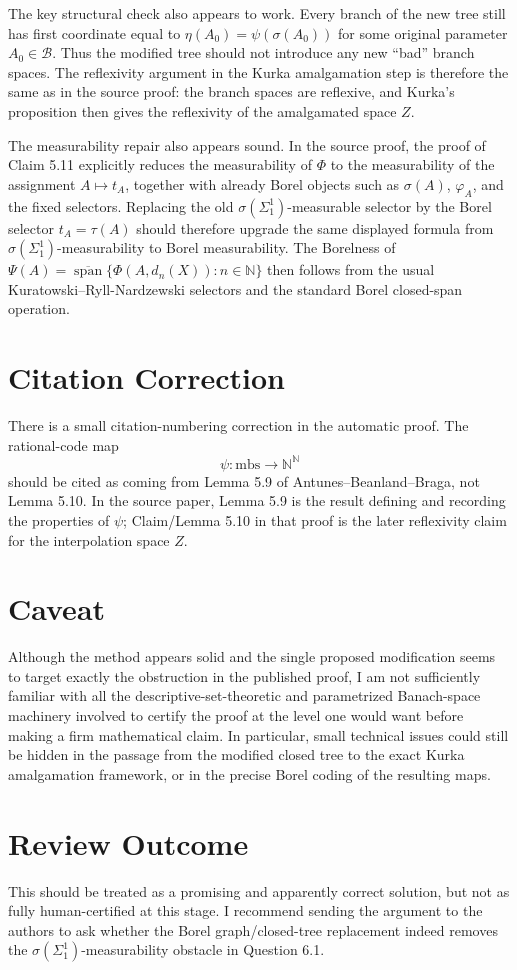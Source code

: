 ﻿\documentclass[11pt]{article}
\begin{document}
The key structural check also appears to work.  Every branch of the new tree
still has first coordinate equal to \(\eta(A_0)=\psi(\sigma(A_0))\) for some
original parameter \(A_0\in\mathcal B\).  Thus the modified tree should not
introduce any new ``bad'' branch spaces.  The reflexivity argument in the
Kurka amalgamation step is therefore the same as in the source proof: the
branch spaces are reflexive, and Kurka's proposition then gives the
reflexivity of the amalgamated space \(Z\).

The measurability repair also appears sound.  In the source proof, the proof
of Claim 5.11 explicitly reduces the measurability of \(\Phi\) to the
measurability of the assignment \(A\mapsto t_A\), together with already Borel
objects such as \(\sigma(A)\), \(\varphi_A\), and the fixed selectors.  Replacing
the old \(\sigma(\Sigma^1_1)\)-measurable selector by the Borel selector
\(t_A=\tau(A)\) should therefore upgrade the same displayed formula from
\(\sigma(\Sigma^1_1)\)-measurability to Borel measurability.  The Borelness of
\(\Psi(A)=\overline{\operatorname{span}}\{\Phi(A,d_n(X)):n\in\mathbb N\}\)
then follows from the usual Kuratowski--Ryll-Nardzewski selectors and the
standard Borel closed-span operation.

\section*{Citation Correction}

There is a small citation-numbering correction in the automatic proof.  The
rational-code map
\[
  \psi:\mathrm{mbs}\to\mathbb N^{\mathbb N}
\]
should be cited as coming from Lemma 5.9 of Antunes--Beanland--Braga, not
Lemma 5.10.  In the source paper, Lemma 5.9 is the result defining and
recording the properties of \(\psi\); Claim/Lemma 5.10 in that proof is the
later reflexivity claim for the interpolation space \(Z\).

\section*{Caveat}

Although the method appears solid and the single proposed modification seems
to target exactly the obstruction in the published proof, I am not sufficiently
familiar with all the descriptive-set-theoretic and parametrized Banach-space
machinery involved to certify the proof at the level one would want before
making a firm mathematical claim.  In particular, small technical issues could
still be hidden in the passage from the modified closed tree to the exact
Kurka amalgamation framework, or in the precise Borel coding of the resulting
maps.

\section*{Review Outcome}

This should be treated as a promising and apparently correct solution, but not
as fully human-certified at this stage.  I recommend sending the argument to
the authors to ask whether the Borel graph/closed-tree
replacement indeed removes the \(\sigma(\Sigma^1_1)\)-measurability obstacle in
Question 6.1.
\end{document}
